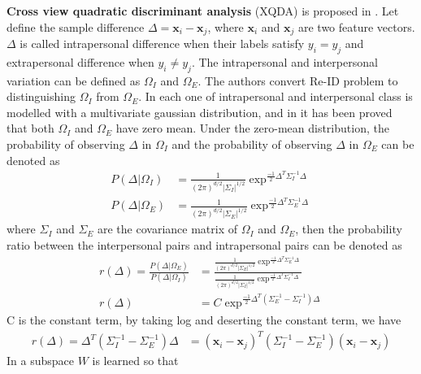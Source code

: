 \textbf{Cross view quadratic discriminant analysis} (XQDA) is proposed in \cite{LOMO}. Let define the sample difference $\Delta = \bm{x}_i - \bm{x}_j$, where $\bm{x}_i $ and $\bm{x}_j$ are two feature vectors. $\Delta$ is called intrapersonal difference when their labels satisfy $y_i = y_j$ and extrapersonal difference when $y_i \ne y_j$. The intrapersonal and interpersonal variation can be defined as $\Omega_I$ and $\Omega_E$. The authors convert Re-ID problem to distinguishing $\Omega_I$ from $\Omega_E$. In \cite{Bayeface}  each one of intrapersonal and interpersonal class is modelled with a multivariate gaussian distribution, and in \cite{Bayeface} it has been proved that both $\Omega_I$ and $\Omega_E$ have zero mean. Under the zero-mean distribution, the probability of observing $\Delta$ in $\Omega_I$ and the probability of observing $\Delta$ in $\Omega_E$ can be denoted as
\begin{equation}
\begin{aligned}
P(\Delta|\Omega_I) &= \frac{1}{(2\pi)^{d/2}|\Sigma_I|^{1/2}}\exp^{\frac{-1}{2}\Delta^T\Sigma_I^{-1}\Delta}\\
P(\Delta|\Omega_E) &= \frac{1}{(2\pi)^{d/2}|\Sigma_E|^{1/2}}\exp^{\frac{-1}{2}\Delta^T\Sigma_E^{-1}\Delta}
\end{aligned}
\end{equation}
where $\Sigma_I$ and $\Sigma_E$ are the covariance matrix of $\Omega_I$ and $\Omega_E$, then the probability ratio between the interpersonal pairs and intrapersonal pairs can be denoted as
\begin{equation}
\begin{aligned}
r(\Delta) = \frac{P(\Delta|\Omega_E)}{P(\Delta|\Omega_I)}
	   &=\frac{\frac{1}{(2\pi)^{d/2}|\Sigma_E|^{1/2}}\exp^{\frac{-1}{2}\Delta^T\Sigma_E^{-1}\Delta}}{\frac{1}{(2\pi)^{d/2}|\Sigma_I|^{1/2}}\exp^{\frac{-1}{2}\Delta^T\Sigma_I^{-1}\Delta}}\\
r(\Delta)& =  C\exp^{\frac{-1}{2}\Delta^T(\Sigma_E^{-1} - \Sigma_I^{-1})\Delta}
\end{aligned}
\end{equation}
C is the constant term, by taking log and deserting the constant term, we have 
\begin{equation}
\begin{aligned}
r(\Delta) = \Delta^T(\Sigma_I^{-1} - \Sigma_E^{-1})\Delta 
	   & = (\bm{x}_i - \bm{x}_j)^T(\Sigma_I^{-1} - \Sigma_E^{-1})(\bm{x}_i - \bm{x}_j)
\end{aligned}
\end{equation}
In \cite{LOMO} a subspace $W$ is learned so that 
